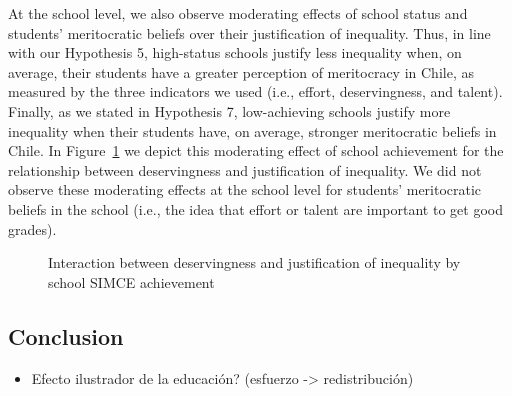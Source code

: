 \documentclass[
  letterpaper,
  DIV=11,
  numbers=noendperiod]{scrartcl}
\providecommand{\tightlist}{%
  \setlength{\itemsep}{0pt}\setlength{\parskip}{0pt}}\usepackage{longtable,booktabs,array}
\begin{document}
At the school level, we also observe moderating effects of school status
and students' meritocratic beliefs over their justification of
inequality. Thus, in line with our Hypothesis 5, high-status schools
justify less inequality when, on average, their students have a greater
perception of meritocracy in Chile, as measured by the three indicators
we used (i.e., effort, deservingness, and talent). Finally, as we stated
in Hypothesis 7, low-achieving schools justify more inequality when
their students have, on average, stronger meritocratic beliefs in Chile.
In Figure~\ref{fig-interaction} we depict this moderating effect of
school achievement for the relationship between deservingness and
justification of inequality. We did not observe these moderating effects
at the school level for students' meritocratic beliefs in the school
(i.e., the idea that effort or talent are important to get good grades).

\begin{figure}


\caption{\label{fig-interaction}Interaction between deservingness and
justification of inequality by school SIMCE achievement}

\end{figure}%

\subsection{Conclusion}\label{conclusion}

\begin{itemize}
\tightlist
\item
  Efecto ilustrador de la educación? (esfuerzo -\textgreater{}
  redistribución)
\end{itemize}
\end{document}
